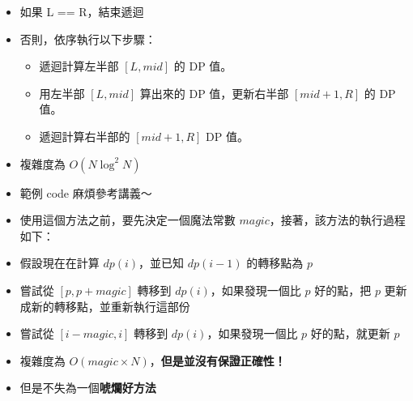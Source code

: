 \documentclass[standalone]{beamer}
\begin{document}
\begin{frame}{}
  \begin{itemize}
    \item 如果 L == R，結束遞迴
    \item 否則，依序執行以下步驟：
    \begin{itemize}
      \item 遞迴計算左半部 $[L, mid]$ 的 DP 值。
      \item 用左半部 $[L, mid]$ 算出來的 DP 值，更新右半部 $[mid + 1, R]$ 的 DP 值。
      \item 遞迴計算右半部的 $[mid + 1, R]$ DP 值。
    \end{itemize}
    \item 複雜度為 $O(N \log^2 N)$
    \item 範例 code 麻煩參考講義～
  \end{itemize}
\end{frame}

\begin{frame}{}
  \begin{itemize}
    \item 使用這個方法之前，要先決定一個魔法常數 $magic$，接著，該方法的執行過程如下：
    \item 假設現在在計算 $dp(i)$，並已知 $dp(i - 1)$ 的轉移點為 $p$
    \item 嘗試從 $[p, p + magic]$ 轉移到 $dp(i)$，如果發現一個比 $p$ 好的點，把 $p$ 更新成新的轉移點，並重新執行這部份
    \item 嘗試從 $[i - magic, i]$ 轉移到 $dp(i)$，如果發現一個比 $p$ 好的點，就更新 $p$
    \item 複雜度為 $O(magic \times N)$，\textbf{但是並沒有保證正確性！}
    \item 但是不失為一個\textbf{唬爛好方法}
  \end{itemize}
\end{frame}
\end{document}
